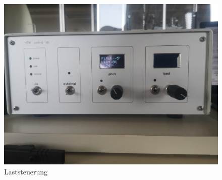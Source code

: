 \begin{figure}[H]
\begin{minipage}[b]{0.45\textwidth}
            \includegraphics[width=\textwidth]{Abbildungen/Lastkontrolle.jpeg}
            \caption{Laststeuerung}
            \label{fig:Laststeuerung}
        \end{minipage}
    \end{figure}  